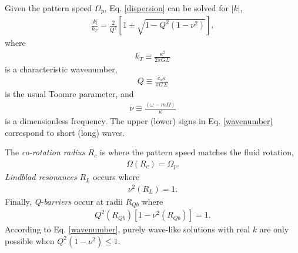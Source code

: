 Given the pattern speed $\Omega_p$,
Eq. \ref{dispersion} can be solved for $|k|$, 
\begin{align}\label{wavenumber}
  \frac{|k|}{k_T} = \frac{2}{Q^2}\left[1 \pm \sqrt{1 -
      Q^2(1-\nu^2)}\right], 
\end{align}
where 
\begin{align}
  k_T \equiv \frac{\kappa^2}{2\pi G \Sigma}
\end{align}
is a characteristic wavenumber, 
\begin{align}
  Q \equiv \frac{c_s\kappa}{\pi G \Sigma}
\end{align}
is the usual Toomre parameter, and
\begin{align}
  \nu \equiv \frac{(\omega - m\Omega)}{\kappa}
\end{align}
is a dimensionless frequency.  The upper (lower) signs in
Eq. \ref{wavenumber} correspond to short (long) waves.  

The \emph{co-rotation radius} $R_c$ is where the pattern speed matches
the fluid rotation,
\begin{align}
  \Omega(R_c) = \Omega_p.
\end{align}
\emph{Lindblad resonances} $R_L$ occurs where
\begin{align}
  \nu^2(R_L) = 1. 
\end{align}
Finally, \emph{Q-barriers} occur at radii $R_{Qb}$ where
\begin{align}
  Q^2(R_{Qb})\left[1-\nu^2(R_{Qb})\right] = 1.  
\end{align}
According to Eq. \ref{wavenumber}, purely wave-like solutions with
real $k$ are only possible when $Q^2(1-\nu^2)\leq1$.  





